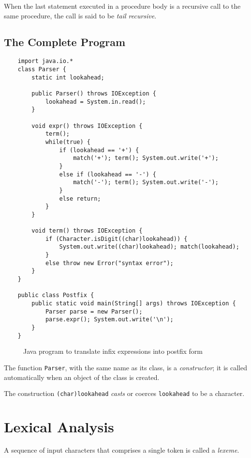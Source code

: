 \documentclass[12pt,a4paper,twoside,openany]{book}
\begin{document}
When the last statement executed in a procedure body is a recursive call to the same procedure, the call is said to be \textit{tail recursive}.

\subsection{The Complete Program}

\begin{Verbatim}
    import java.io.*
    class Parser {
        static int lookahead;

        public Parser() throws IOException {
            lookahead = System.in.read();
        }

        void expr() throws IOException {
            term();
            while(true) {
                if (lookahead == '+') {
                    match('+'); term(); System.out.write('+');
                }
                else if (lookahead == '-') {
                    match('-'); term(); System.out.write('-');
                }
                else return;
            }
        }

        void term() throws IOException {
            if (Character.isDigit((char)lookahead)) {
                System.out.write((char)lookahead); match(lookahead);
            }
            else throw new Error("syntax error");
        }
    }

    public class Postfix {
        public static void main(String[] args) throws IOException {
            Parser parse = new Parser();
            parse.expr(); System.out.write('\n');
        }
    }
\end{Verbatim}
\begin{figure}[htbp]
    \caption{Java program to translate infix expressions into postfix form}
    \label{Figure:2.27}
\end{figure}

The function \verb|Parser|, with the same name as its class, is a \textit{constructor}; it is called automatically when an object of the class is created.

The construction \verb|(char)lookahead| \textit{casts} or coerces \verb|lookahead| to be a character.

\section{Lexical Analysis}

A sequence of input characters that comprises a single token is called a \textit{lexeme}.
\end{document}
